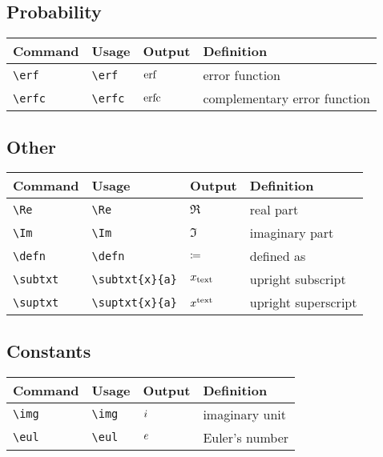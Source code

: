 \documentclass[11pt]{article}
\begin{document}
\subsection{Probability}

\begin{tabular}{llll}
    Command      & Usage        & Output  & Definition                   \\
    \hline
    \verb|\erf|  & \verb|\erf|  & $\operatorname{erf}$  & error function               \\
    \verb|\erfc| & \verb|\erfc| & $\operatorname{erfc}$ & complementary error function \\
\end{tabular}

\subsection{Other}

\begin{tabular}{llll}
    Command        & Usage                & Output             & Definition          \\
    \hline
    \verb|\Re|     & \verb|\Re|           & $\Re$              & real part           \\
    \verb|\Im|     & \verb|\Im|           & $\Im$              & imaginary part      \\
    \verb|\defn|   & \verb|\defn|         & $\coloneq$            & defined as          \\
    \verb|\subtxt| & \verb|\subtxt{x}{a}| & $x_{\mathrm{text}}$ & upright subscript   \\
    \verb|\suptxt| & \verb|\suptxt{x}{a}| & $x^{\mathrm{text}}$ & upright superscript \\
\end{tabular}

\subsection{Constants}

\begin{tabular}{llll}
    Command     & Usage       & Output & Definition     \\
    \hline
    \verb|\img| & \verb|\img| & $i$ & imaginary unit \\
    \verb|\eul| & \verb|\eul| & $e$ & Euler's number \\
\end{tabular}
\end{document}

